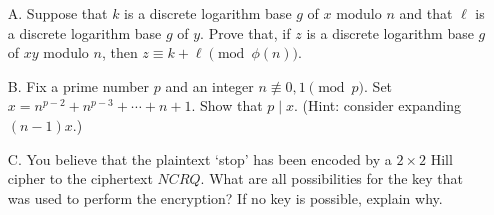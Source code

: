\documentclass[12pt]{article}
\begin{document}
\begin{enumerate}
 \vspace{2em}
{ The following problems will be graded for proficiency credit only. . You may do as many or as few of them as you would like.}
\item[A.]  Suppose that $k$ is a discrete logarithm base $g$ of $x$ modulo $n$ and that $\ell$ is a discrete logarithm base $g$ of $y$.  Prove that, if $z$ is a discrete logarithm base $g$ of $xy$ modulo $n$, then $z\equiv k+\ell\pmod{\phi(n)}$.  
\item[B.] Fix a prime number $p$ and an integer $n\not\equiv 0,1\pmod{p}$. Set $x=n^{p-2}+n^{p-3}+\cdots+n+1$. Show that $p\mid x$. (Hint: consider expanding $(n-1)x$.)
\item[C.] You believe that the plaintext `stop' has been encoded by a $2\times 2$ Hill cipher to the ciphertext $NCRQ$. What are all possibilities for the key that was used to perform the encryption? If no key is possible, explain why. 
\end{enumerate}
\end{document}
